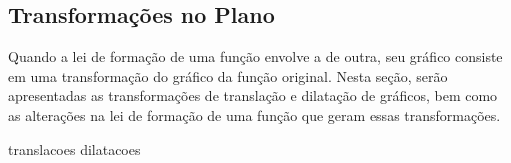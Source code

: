 \subsection{Transformações no Plano}

Quando a lei de formação de uma função envolve a de outra, seu gráfico consiste em uma transformação do gráfico da função original.
Nesta seção, serão apresentadas as transformações de translação e dilatação de gráficos, bem como as alterações na lei de formação de uma função que geram essas transformações.

{translacoes}
{dilatacoes}
